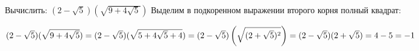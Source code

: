  Вычислить: $(2-\sqrt{5})(\sqrt{9+4\sqrt{5}})$
\Solution
Выделим в подкоренном выражении второго корня полный квадрат:
\begin{center}
$(2-\sqrt{5})(\sqrt{9+4\sqrt{5}})=(2-\sqrt{5})(\sqrt{5+4\sqrt{5}+4})=(2-\sqrt{5})\left(\sqrt{(2+\sqrt{5})^2}\right)\hm=(2-\sqrt{5})(2+\sqrt{5})\hm=4-5\hm=-1$
\end{center}
